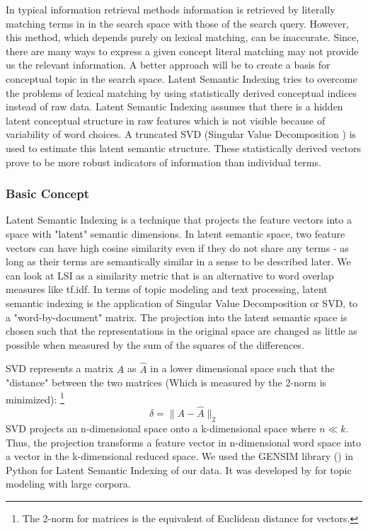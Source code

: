 In typical information retrieval methods information is retrieved 
by literally matching terms in in the search space with those of the 
search query. However, this method, which depends purely on lexical 
matching, can be inaccurate. Since, there are many ways to express a given 
concept literal matching may not provide us the 
relevant information. A better approach will be to create a basis for 
conceptual topic in the search space. Latent Semantic Indexing 
tries to overcome the problems of lexical matching by using 
statistically derived conceptual indices instead of raw data. Latent 
Semantic Indexing  assumes that there is a hidden latent conceptual 
structure in raw features which is not visible because of 
variability of word choices. A truncated SVD (Singular Value 
Decomposition ) is used to estimate this latent semantic structure. 
These statistically derived vectors prove to be more robust 
indicators of information than individual terms. 

\subsubsection*{Basic Concept}
Latent Semantic Indexing is a technique that projects the feature 
vectors into a space with "latent" semantic dimensions. In latent 
semantic space,  two feature vectors can have high cosine similarity 
even if they do not share any terms - as long as their terms are 
semantically similar in a sense to be described later. We can look 
at LSI as a similarity metric that is an alternative to word overlap 
measures like tf.idf. 
In terms of topic modeling and text processing, latent semantic 
indexing is the application of Singular Value Decomposition or SVD, 
to a "word-by-document" matrix. The projection into the latent 
semantic space is chosen such that the representations in the 
original space are changed as little as possible when measured by 
the sum of the squares of the differences. 

SVD represents a matrix $A$ as $\hat{A}$ in a lower dimensional 
space such that the "distance" between the two matrices (Which is 
measured by the 2-norm is minimized): 
\footnote{ The 2-norm for matrices is the equivalent of Euclidean distance for vectors.}
		$$ \delta = \| A - \hat{A} \| _{2}$$
SVD projects an n-dimensional space onto a k-dimensional space where 
$n \ll k$. Thus, the projection transforms a feature vector in 
n-dimensional word space into a vector in the k-dimensional reduced 
space. 
We used the GENSIM library (\citet*{gensim}) in Python for Latent Semantic 
Indexing of our data. It was developed by \citet*{radimrehurek} for topic modeling with large corpora.
		 
